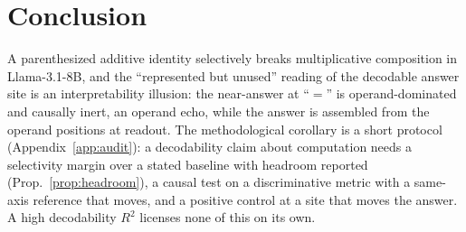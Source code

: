 \section{Conclusion}
\label{sec:conclusion}

A parenthesized additive identity selectively breaks multiplicative composition in Llama-3.1-8B,
and the ``represented but unused'' reading of the decodable answer site is an interpretability
illusion: the near-answer at ``$=$'' is operand-dominated and causally inert, an operand echo, while
the answer is assembled from the operand positions at readout. The methodological corollary is a
short protocol (Appendix~\ref{app:audit}): a decodability claim about computation needs a
selectivity margin over a stated baseline with headroom reported (Prop.~\ref{prop:headroom}), a
causal test on a discriminative metric with a same-axis reference that moves, and a positive
control at a site that moves the answer. A high decodability $R^2$ licenses none of this on its own.
